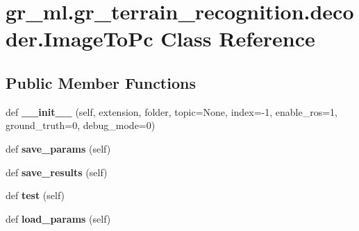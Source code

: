 \hypertarget{classgr__ml_1_1gr__terrain__recognition_1_1decoder_1_1ImageToPc}{}\section{gr\+\_\+ml.\+gr\+\_\+terrain\+\_\+recognition.\+decoder.\+Image\+To\+Pc Class Reference}
\label{classgr__ml_1_1gr__terrain__recognition_1_1decoder_1_1ImageToPc}
\subsection*{Public Member Functions}
\begin{DoxyCompactItemize}
\item 
\mbox{\label{classgr__ml_1_1gr__terrain__recognition_1_1decoder_1_1ImageToPc_a64cca22de3453e854569b264a7682faa}} 
def {\bfseries \+\_\+\+\_\+init\+\_\+\+\_\+} (self, extension, folder, topic=None, index=-\/1, enable\+\_\+ros=1, ground\+\_\+truth=0, debug\+\_\+mode=0)
\item 
\mbox{\label{classgr__ml_1_1gr__terrain__recognition_1_1decoder_1_1ImageToPc_a403bd02a006bf56c65cbba48ccc54152}} 
def {\bfseries save\+\_\+params} (self)
\item 
\mbox{\label{classgr__ml_1_1gr__terrain__recognition_1_1decoder_1_1ImageToPc_a44f4dcf63b60859e3fec88e6fc875913}} 
def {\bfseries save\+\_\+results} (self)
\item 
\mbox{\label{classgr__ml_1_1gr__terrain__recognition_1_1decoder_1_1ImageToPc_ada5a90790d4bd56c617fbfc3928affd8}} 
def {\bfseries test} (self)
\item 
\mbox{\label{classgr__ml_1_1gr__terrain__recognition_1_1decoder_1_1ImageToPc_a80c23878255bc33b2b0dd72c4a309247}} 
def {\bfseries load\+\_\+params} (self)
\item 
\mbox{\label{classgr__ml_1_1gr__terrain__recognition_1_1decoder_1_1ImageToPc_aeb8440c01d207b09c512c302e0241cdf}} 

\end{DoxyCompactItemize}
